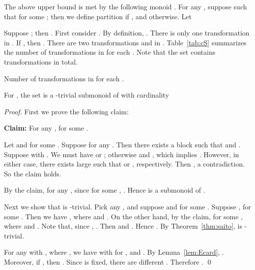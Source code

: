 \documentclass{llncs}
\newcommand{\qedb}{\hfill}
\begin{document}
The above upper bound is met by the following monoid . For any , suppose  such that  for some ; then we define partition  if , and  otherwise. Let 


\begin{example}\label{ex:cS} 
Suppose ; then . First consider . By definition, . There is only one transformation  in . If , then . There are two transformations  and  in . Table~\ref{tab:cS} summarizes the number of transformations in  for each . Note that the set  contains  transformations in total. 
\qedb


\begin{table}[hbt]
\caption{Number of transformations in  for each .}
\label{tab:cS}
\begin{center}

\end{center}
\end{table}
\end{example}





\begin{proposition}\label{prop:cS}
For , the set  is a -trivial submonoid of  with cardinality 

\end{proposition}




\begin{proof}
First we prove the following claim: 

\medskip

{\bf Claim:} For any ,  for some . 

Let  and  for some . Suppose  for any . Then there exists a block  such that  and . Suppose  with . We must have  or ; otherwise  and , which implies . However, in either case, there exists large  such that  or , respectively. Then , a contradiction. So the claim holds. \qedb 

\medskip

By the claim, for any , since  for some , . Hence  is a submonoid of . 

Next we show that  is -trivial. Pick any , and suppose  and  for some . Suppose , for some . Then we have , where  and . On the other hand, by the claim,  for some , where  and . Note that, since , . Then  and . Hence . By Theorem~\ref{thm:saito},  is -trivial. 

For any  with , where , we have  with  for , and . By Lemma~\ref{lem:Ecard}, . Moreover, if , then . Since  is fixed, there are  different . Therefore . \qed
\end{proof}
\end{document}
